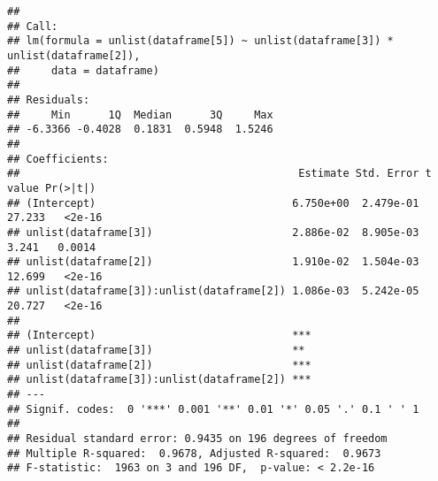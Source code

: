 \documentclass[
]{article}
\begin{document}
\begin{verbatim}
## 
## Call:
## lm(formula = unlist(dataframe[5]) ~ unlist(dataframe[3]) * unlist(dataframe[2]), 
##     data = dataframe)
## 
## Residuals:
##     Min      1Q  Median      3Q     Max 
## -6.3366 -0.4028  0.1831  0.5948  1.5246 
## 
## Coefficients:
##                                            Estimate Std. Error t value Pr(>|t|)
## (Intercept)                               6.750e+00  2.479e-01  27.233   <2e-16
## unlist(dataframe[3])                      2.886e-02  8.905e-03   3.241   0.0014
## unlist(dataframe[2])                      1.910e-02  1.504e-03  12.699   <2e-16
## unlist(dataframe[3]):unlist(dataframe[2]) 1.086e-03  5.242e-05  20.727   <2e-16
##                                              
## (Intercept)                               ***
## unlist(dataframe[3])                      ** 
## unlist(dataframe[2])                      ***
## unlist(dataframe[3]):unlist(dataframe[2]) ***
## ---
## Signif. codes:  0 '***' 0.001 '**' 0.01 '*' 0.05 '.' 0.1 ' ' 1
## 
## Residual standard error: 0.9435 on 196 degrees of freedom
## Multiple R-squared:  0.9678, Adjusted R-squared:  0.9673 
## F-statistic:  1963 on 3 and 196 DF,  p-value: < 2.2e-16
\end{verbatim}
\end{document}
